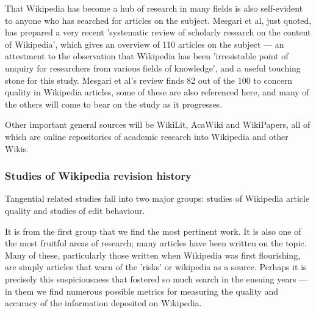 \documentclass[a4paper,11pt,twoside,notitlepage]{article}
\begin{document}
        That Wikipedia has become a hub of research in many fields is
        also self-evident to anyone who has searched for articles on
        the subject. Mesgari et al, just quoted, has prepared a very
        recent 'systematic review of scholarly research on the content
        of Wikipedia', which gives an overview of 110 articles on the
        subject --- an attestment to the observation that Wikipedia
        has been 'irresistable point of unquiry for researchers from
        various fields of knowledge', and a useful touching stone for
        this study. Mesgari et al's review finds 82 out of the 100 to
        concern quality in Wikipedia articles, some of these are also
        referenced here, and many of the others will come to bear on
        the study as it progresses.

        Other important general sources will be WikiLit,\cite{wikilit}
        AcaWiki\cite{acawiki} and WikiPapers\cite{wikipapers}, all of
        which are online repositories of academic research into
        Wikipedia and other Wikis.       

        
        \subsubsection*{Studies of Wikipedia revision history}
        Tangential related studies fall into two major groups: studies
        of Wikipedia article quality and studies of edit behaviour.

        It is from the first group that we find the most pertinent
        work. It is also one of the most fruitful areas of research;
        many articles have been written on the topic. Many of these,
        particularly those written when Wikipedia was first
        flourishing, are simply articles that warn of the 'risks' or
        wikipedia as a source.\cite{Denning2005} Perhaps it is
        precisely this suspiciousness that fostered so much search in
        the ensuing years --- in them we find numerous possible
        metrics for measuring the quality and accuracy of the
        information deposited on Wikipedia.
\end{document}
